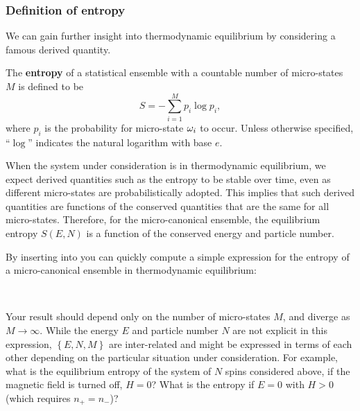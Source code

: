 \subsubsection{Definition of entropy}
We can gain further insight into thermodynamic equilibrium by considering a famous derived quantity.
\begin{shaded}
  The \textbf{entropy} of a statistical ensemble \Om with a countable number of micro-states $M$ is defined to be
  \begin{equation}
    \label{eq:entropy}
    S = - \sum_{i = 1}^M p_i \log p_i,
  \end{equation}
  where $p_i$ is the probability for micro-state $\omega_i$ to occur.
  Unless otherwise specified, ``$\log$'' indicates the natural logarithm with base $e$.
\end{shaded}

When the system under consideration is in thermodynamic equilibrium, we expect derived quantities such as the entropy to be stable over time, even as different micro-states are probabilistically adopted.
This implies that such derived quantities are functions of the conserved quantities that are the same for all micro-states.
Therefore, for the micro-canonical ensemble, the equilibrium entropy $S(E, N)$ is a function of the conserved energy and particle number.

By inserting  into  you can quickly compute a simple expression for the entropy of a micro-canonical ensemble in thermodynamic equilibrium:
\begin{mdframed}
  \ \\[40 pt]
\end{mdframed}
Your result should depend only on the number of micro-states $M$, and diverge as $M \to \infty$.
While the energy $E$ and particle number $N$ are not explicit in this expression, $\left\{E, N, M\right\}$ are inter-related and might be expressed in terms of each other depending on the particular situation under consideration.
For example, what is the equilibrium entropy of the system of $N$ spins considered above, if the magnetic field is turned off, $H = 0$?
What is the entropy if $E = 0$ with $H > 0$ (which requires $n_+ = n_-$)?
\begin{mdframed}
  \ \\[90 pt] %
\end{mdframed}



